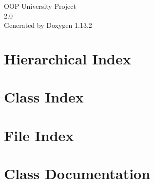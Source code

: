 \documentclass[twoside]{book}
\newcommand{\+}{\discretionary{\mbox{\scriptsize$\hookleftarrow$}}{}{}}
\newcommand{\clearemptydoublepage}{%
    \newpage{\pagestyle{empty}\cleardoublepage}%
  }
\begin{document}
  \raggedbottom
    \hypersetup{pageanchor=false,
                bookmarksnumbered=true,
                pdfencoding=unicode
               }
  \begin{titlepage}
  \vspace*{7cm}
  \begin{center}%
  {\Large OOP University Project}\\
  [1ex]\large 2.\+0 \\
  \vspace*{1cm}
  {\large Generated by Doxygen 1.13.2}\\
  \end{center}
  \end{titlepage}
  \clearemptydoublepage
  \tableofcontents
  \clearemptydoublepage
  \hypersetup{pageanchor=true}
\chapter{Hierarchical Index}

\chapter{Class Index}

\chapter{File Index}

\chapter{Class Documentation}
































\end{document}
